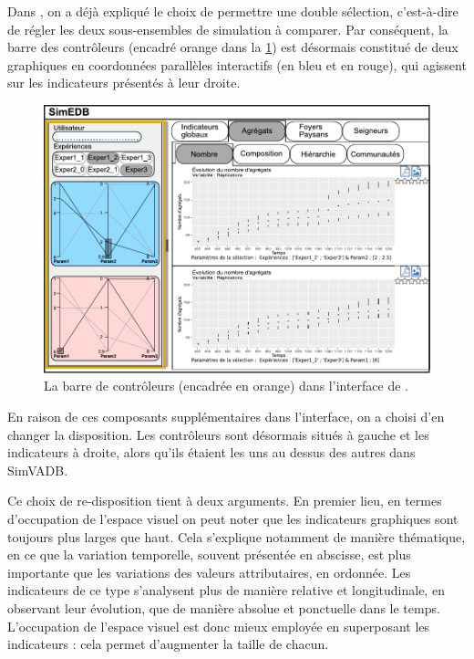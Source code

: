 Dans \simedb{}, on a déjà expliqué le choix de permettre une double sélection, c'est-à-dire de régler les deux sous-ensembles de simulation à comparer.
Par conséquent, la barre des contrôleurs (encadré orange dans la \cref{fig:simedb-sidebar}) est désormais constitué de deux graphiques en coordonnées parallèles interactifs (en bleu et en rouge), qui agissent sur les indicateurs présentés à leur droite.

\begin{figure}[H]
	\centering
	\includegraphics[width=\linewidth]{img/mockup_SimEDB_controleurs.pdf}
	\caption[La barre de contrôleurs dans l'interface de \simedb{}.]{La barre de contrôleurs (encadrée en orange) dans l'interface de \simedb{}.}
	\label{fig:simedb-sidebar}
\end{figure}

En raison de ces composants supplémentaires dans l'interface, on a choisi d'en changer la disposition.
Les contrôleurs sont désormais situés à gauche et les indicateurs à droite, alors qu'ils étaient les uns au dessus des autres dans SimVADB.

Ce choix de re-disposition tient à deux arguments.
En premier lieu, en termes d'occupation de l'espace visuel on peut noter que les indicateurs graphiques sont toujours plus larges que haut.
Cela s'explique notamment de manière thématique, en ce que la variation temporelle, souvent présentée en abscisse, est plus importante que les variations des valeurs attributaires, en ordonnée.
Les indicateurs de ce type s'analysent plus de manière relative et longitudinale, en observant leur évolution, que de manière absolue et ponctuelle dans le temps.
L'occupation de l'espace visuel est donc mieux employée en superposant les indicateurs : cela permet d'augmenter la taille de chacun.

